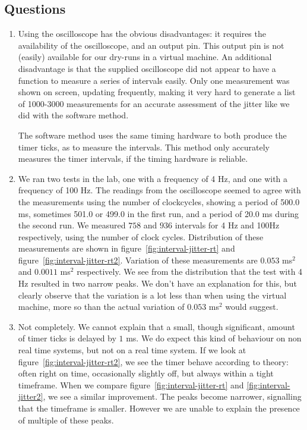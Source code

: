\documentclass[a4paper,twoside,11pt]{article}
\begin{document}
\subsection{Questions}
\begin{enumerate}
 \item Using the oscilloscope has the obvious disadvantages: it requires the availability of the oscilloscope, and an output pin. This output pin is not (easily) available for our dry-runs in a virtual machine. An additional disadvantage is that the supplied oscilloscope did not appear to have a function to measure a series of intervals easily. Only one measurement was shown on screen, updating frequently, making it very hard to generate a list of 1000-3000 measurements for an accurate assessment of the jitter like we did with the software method.
 
 The software method uses the same timing hardware to both produce the timer ticks, as to measure the intervals. This method only accurately measures the timer intervals, if the timing hardware is reliable.
 \item We ran two tests in the lab, one with a frequency of 4 Hz, and one with a frequency of 100 Hz. The readings from the oscilloscope seemed to agree with the measurements using the number of clockcycles, showing a period of 500.0 ms, sometimes 501.0 or 499.0 in the first run, and a period of 20.0 ms during the second run. We measured $758$ and $936$ intervals for 4 Hz and 100Hz respectively, using the number of clock cycles. Distribution of these measurements are shown in figure~\ref{fig:interval-jitter-rt} and figure~\ref{fig:interval-jitter-rt2}. Variation of these measurements are $0.053$ ms$^2$ and $0.0011$ ms$^2$ respectively. We see from the distribution that the test with 4 Hz resulted in two narrow peaks. We don't have an explanation for this, but clearly observe that the variation is a lot less than when using the virtual machine, more so than the actual variation of $0.053$ ms$^2$ would suggest.
 
 \item Not completely. We cannot explain that a small, though significant, amount of timer ticks is delayed by $1$ ms. We do expect this kind of behaviour on non real time systems, but not on a real time system. If we look at figure~\ref{fig:interval-jitter-rt2}, we see the timer behave according to theory: often right on time, occasionally slightly off, but always within a tight timeframe. When we compare figure~\ref{fig:interval-jitter-rt} and \ref{fig:interval-jitter2}, we see a similar improvement. The peaks become narrower, signalling that the timeframe is smaller. However we are unable to explain the presence of multiple of these peaks.
\end{enumerate}
\end{document}
